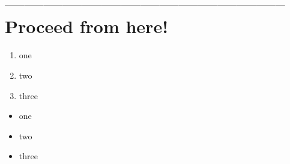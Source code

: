 \documentclass[11pt,a4paper, titlepage, parskip=half, headsepline, footsepline, cleardoublepage=current, headheight=1cm]{scrbook}
\begin{document}

\hrulefill\newpage 
\section{-------------------------------------------- Proceed from here!}
\lipsum[1]

\begin{enumerate}[label=P\arabic*.]
\item{one}
\item{two}
\item{three}
\end{enumerate}

\begin{itemize}[nosep]
\item{one}
\item{two}
\item{three}
\end{itemize}

\begin{lstlisting}[numbers=left]
\end{lstlisting}
\end{document}
